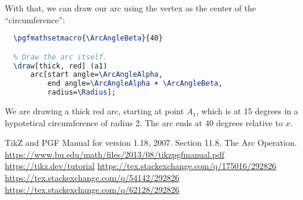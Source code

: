 \documentclass{amsart}
\begin{document}
With that, we can draw our arc using the vertex as the center of the
``circumference'':

\begin{lstlisting}[language=tex]
  % Angle in degrees where the arc Beta ends. Relative to `x'.
  \pgfmathsetmacro{\ArcAngleBeta}{40}

  % Draw the arc itself.
  \draw[thick, red] (a1)
      arc[start angle=\ArcAngleAlpha,
          end angle=\ArcAngleAlpha + \ArcAngleBeta,
          radius=\Radius];
\end{lstlisting}

We are drawing a thick red arc, starting at point $A_1$, which is at 15 degrees
in a hypotetical circumference of radius 2. The arc ends at 40 degrees relative
to $x$.

\begin{thebibliography}{9}
  TikZ and PGF Manual for version 1.18, 2007. Section 11.8, The Arc Operation.
  \url{https://www.bu.edu/math/files/2013/08/tikzpgfmanual.pdf}
  \url{https://tikz.dev/tutorial}
  \url{https://tex.stackexchange.com/q/175016/292826}
  \url{https://tex.stackexchange.com/q/54142/292826}
  \url{https://tex.stackexchange.com/q/62128/292826}
\end{thebibliography}
\end{document}
